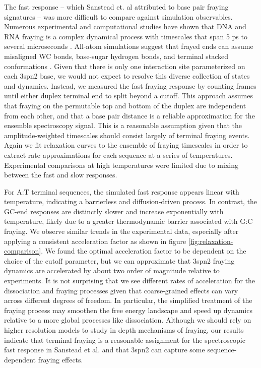 \documentclass[journal=jpcbfk,manuscript=article]{achemso}
\begin{document}
The fast response -- which Sanstead et. al attributed to base pair fraying signatures -- was more difficult to compare against simulation observables. Numerous experimental and computational studies have shown that DNA and RNA fraying is a complex dynamical process with timescales that span 5 ps to several microseconds \citep{ Nonin1995TerminalFraying, Nikolova2012ProbingSimulations, Andreatta2006UltrafastHelix, Galindo-Murillo2015ConvergenceDGCACGAACGAACGAACGC}. All-atom simulations suggest that frayed ends can assume misaligned WC bonds, base-sugar hydrogen bonds, and terminal stacked conformations \citep{PinamontiTheModels, Zgarbova2014BaseRNA}. Given that there is only one interaction site parameterized on each 3spn2 base, we would not expect to resolve this diverse collection of states and dynamics. Instead, we measured the fast fraying response by counting frames until either duplex terminal end to split beyond a cutoff. This approach assumes that fraying on the permutable top and bottom of the duplex are independent from each other, and that a base pair distance is a reliable approximation for the ensemble spectroscopy signal. This is a reasonable assumption given that the amplitude-weighted timescales should consist largely of terminal fraying events. Again we fit relaxation curves to the ensemble of fraying timescales in order to extract rate approximations for each sequence at a series of temperatures. Experimental comparisons at high temperatures were limited due to mixing between the fast and slow responses.

For A:T terminal sequences, the simulated fast response appears linear with temperature, indicating a barrierless and diffusion-driven process. In contrast, the GC-end responses are distinctly slower and increase exponentially with temperature, likely due to a greater thermodynamic barrier associated with G:C fraying. We observe similar trends in the experimental data, especially after applying a consistent acceleration factor as shown in figure \ref{fig:relaxation-comparison}. We found the optimal acceleration factor to be dependent on the choice of the cutoff parameter, but we can approximate that 3spn2 fraying dynamics are accelerated by about two order of magnitude relative to experiments. It is not surprising that we see different rates of acceleration for the dissociation and fraying processes given that coarse-grained effects can vary across different degrees of freedom. In particular, the simplified treatment of the fraying process may smoothen the free energy landscape and speed up dynamics relative to a more global processes like dissociation. Although we should rely on higher resolution models to study in depth mechanisms of fraying, our results indicate that terminal fraying is a reasonable assignment for the spectroscopic fast response in Sanstead et al. and that 3spn2 can capture some sequence-dependent fraying effects.
\end{document}
